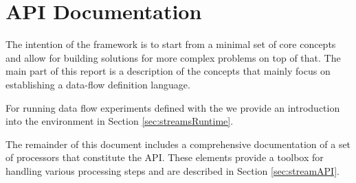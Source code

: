 \clearpage
\part{API Documentation}

The intention of the \streams framework is to start from a minimal set
of core concepts and allow for building solutions for more complex
problems on top of that. The main part of this report is a description
of the concepts that mainly focus on establishing a data-flow
definition language.

For running data flow experiments defined with the \streams we provide
an introduction into the  environment in Section
\ref{sec:streamsRuntime}.

\bigskip

The remainder of this document includes a comprehensive documentation
of a set of processors that constitute the \streams API. These
elements provide a toolbox for handling various processing steps and
are described in Section \ref{sec:streamAPI}.


\begin{appendix}

%


\end{appendix}